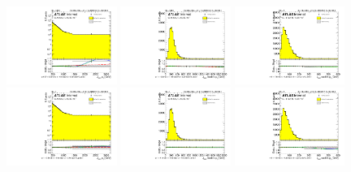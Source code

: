 \begin{figure}[htbp!]
\begin{center}
\includegraphics[width=0.32\textwidth,angle=-90]{figures/boosted/Reweight/Fits/Moriond_bkg_3_NoTag_2Trk_split_subl_Incl_leadHCand_Pt_m_1.pdf}
\includegraphics[width=0.32\textwidth,angle=-90]{figures/boosted/Reweight/Fits/Moriond_bkg_3_NoTag_2Trk_split_subl_Incl_leadHCand_trk0_Pt.pdf}
\includegraphics[width=0.32\textwidth,angle=-90]{figures/boosted/Reweight/Fits/Moriond_bkg_3_NoTag_2Trk_split_subl_Incl_leadHCand_trk1_Pt.pdf} \\
\includegraphics[width=0.32\textwidth,angle=-90]{figures/boosted/Reweight/Fits/Moriond_bkg_9_NoTag_2Trk_split_subl_Incl_leadHCand_Pt_m_1.pdf}
\includegraphics[width=0.32\textwidth,angle=-90]{figures/boosted/Reweight/Fits/Moriond_bkg_9_NoTag_2Trk_split_subl_Incl_leadHCand_trk0_Pt.pdf}
\includegraphics[width=0.32\textwidth,angle=-90]{figures/boosted/Reweight/Fits/Moriond_bkg_9_NoTag_2Trk_split_subl_Incl_leadHCand_trk1_Pt.pdf} \\

\end{center}
\end{figure}
